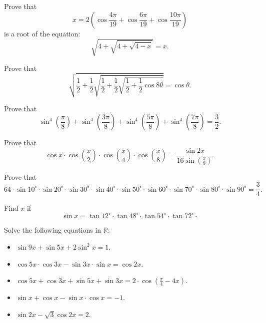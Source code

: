 \documentclass[12pt,a4paper]{memoir}
\theoremstyle{definition}
\begin{document}
\begin{question} Prove that $$x=2\left(\cos\frac{4\pi}{19}+\cos\frac{6\pi}{19}+\cos\frac{10\pi}{19}\right)$$ is a root of the equation:
	\[\sqrt{4+\sqrt{4+\sqrt{4-x}}}=x.\]
\end{question}



\begin{question} Prove that
	\[\sqrt{\frac12+\frac12 \sqrt{\frac12+\frac12 \sqrt{\frac12+\frac12 \cos 8\theta}}}=\cos \theta.\]
\end{question}


\begin{question} Prove that
	\[ \sin^4 \left(\frac{\pi}{8}\right)+\sin^4 \left(\frac{3\pi}{8}\right)+\sin^4 \left(\frac{5\pi}{8}\right)+\sin^4 \left(\frac{7\pi}{8}\right)=\frac32.\]
\end{question}


\begin{question} Prove that
	\[\cos x \cdot \cos \left(\frac{x}{2}\right) \cdot \cos \left(\frac{x}{4}\right) \cdot \cos \left(\frac{x}{8}\right)= \dfrac{\sin 2x}{\displaystyle 16 \sin \left(\frac{x}{8}\right)}.\]
\end{question}



\begin{question} Prove that
	\[64 \cdot \sin 10^{\circ}\cdot \sin 20^{\circ}\cdot \sin 30^{\circ}\cdot \sin 40^{\circ}\cdot \sin 50^{\circ}\cdot \sin 60^{\circ}\cdot \sin 70^{\circ}\cdot \sin 80^{\circ}\cdot \sin 90^{\circ}=\dfrac34.\]
\end{question}



\begin{question} Find $x$ if
	\[\sin x= \tan12^{\circ}\cdot \tan48^{\circ}\cdot \tan54^{\circ} \cdot \tan72^{\circ}\cdot\]
\end{question}



\begin{question} Solve the following equations in $\mathbb R$:
	\begin{itemize}
		
		\item $\sin 9x+ \sin 5x + 2\sin^2 x=1$.
		
		\item $\cos 5x \cdot \cos 3x - \sin 3x \cdot \sin x = \cos 2x$.
		
		\item $\displaystyle\cos 5x+\cos 3x+\sin 5x+\sin 3x=2 \cdot \cos\left(\frac{\pi}4 - 4x\right)$.
		
		\item $\sin x + \cos x -\sin x \cdot \cos x= -1$.
		
		\item $\sin 2x - \sqrt 3 \cos 2x = 2$.
		
		
	\end{itemize}
\end{question}
\end{document}

